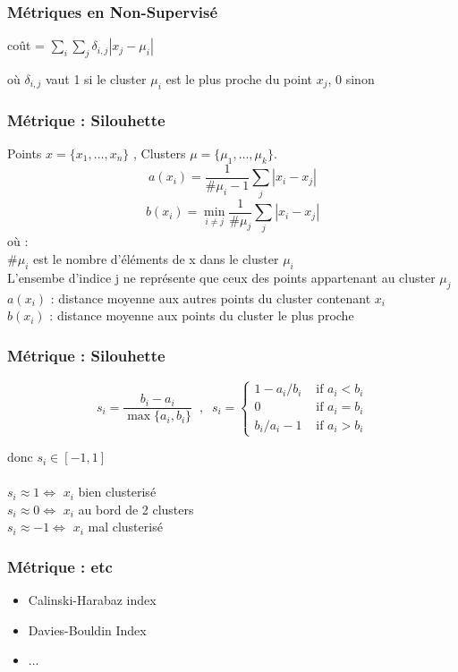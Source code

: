 
\begin{frame}
  \frametitle{Métriques en Non-Supervisé}
  \begin{center}
    coût = $\sum_i \sum_j \delta_{i,j}\left| x_j - \mu_i \right|$
  \end{center}
  où $\delta_{i,j}$ vaut 1 si le cluster $\mu_i$ est le plus proche du point $x_j$, 0 sinon
\end{frame}

\begin{frame}
  \frametitle{Métrique : Silouhette}
  Points $x = \{x_1, \dotsc, x_n\}$ , Clusters $\mu = \{\mu_1, \dotsc, \mu_k\}$. \\
  \[
  \boxed{a(x_i) = \frac{1}{\#\mu_i-1}\sum_j |x_i - x_j|}
  \]
  \[
  \boxed{b(x_i) = \min_{i \neq j} \frac{1}{\#\mu_j}\sum_j |x_i - x_j|}
  \]
  où : \\
  $\#\mu_i$ est le nombre d'éléments de x dans le cluster $\mu_i$ \\
  L'ensembe d'indice j ne représente que ceux des points appartenant au cluster $\mu_j$ \\
  $a(x_i)$ : distance moyenne aux autres points du cluster contenant $x_i$ \\
  $b(x_i)$ : distance moyenne aux points du cluster le plus proche
  
\end{frame}

\begin{frame}
  \frametitle{Métrique : Silouhette}
  
  \begin{center}
    \[
    s_i = \frac{b_i - a_i}{\max\{a_i, b_i\}}\;\;,\;\;
    s_i = \left\{
    \begin{array}{ll}
      1 - a_i/b_i & \mbox{ if } a_i < b_i \\[2mm]
      0 & \mbox{ if } a_i = b_i \\[2mm]
      b_i / a_i - 1 & \mbox{ if } a_i > b_i
    \end{array}\right.
    \]
    
  \end{center}
  donc $s_i \in [-1, 1]$ \\
  \\
  $s_i \approx 1 \iff$ $x_i$ bien clusterisé \\
  $s_i \approx 0 \iff$ $x_i$ au bord de 2 clusters\\
  $s_i \approx -1 \iff$ $x_i$ mal clusterisé
\end{frame}

\begin{frame}
  \frametitle{Métrique : etc}
  \begin{itemize}
  \item Calinski-Harabaz index
  \item Davies-Bouldin Index
  \item ...
  \end{itemize}
\end{frame}
